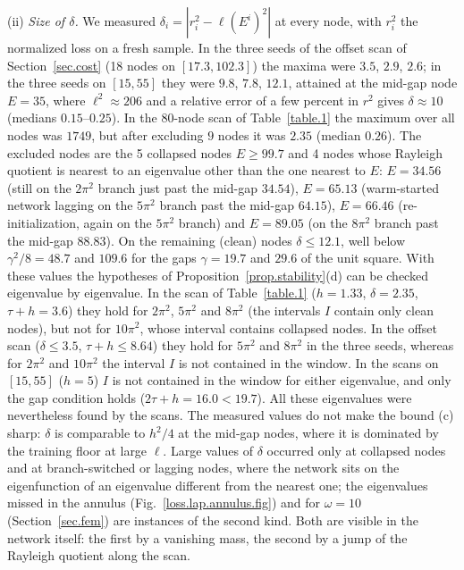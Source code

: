 \documentclass[10pt]{amsart}
\newenvironment{revblock}{\color{blue}}{}
\theoremstyle{definition}
\theoremstyle{remark}
\theoremstyle{plain}
\begin{document}
\begin{revblock}
(ii) \emph{Size of $\delta$.} We measured $\delta_i=|r_i^2-\ell(E^i)^2|$ at every node, with $r_i^2$ the
normalized loss on a fresh sample. In the three seeds of the offset scan of Section~\ref{sec.cost}
(18 nodes on $[17.3,102.3]$) the maxima were $3.5$, $2.9$, $2.6$; in the three seeds on $[15,55]$ they
were $9.8$, $7.8$, $12.1$, attained at the mid-gap node $E=35$, where $\ell^2\approx206$ and a relative
error of a few percent in $r^2$ gives $\delta\approx10$ (medians $0.15$--$0.25$). In the 80-node scan of
Table~\ref{table.1} the maximum over all nodes was $1749$, but after excluding $9$ nodes it was $2.35$
(median $0.26$). The excluded nodes are the 5 collapsed nodes $E\ge99.7$ and 4 nodes whose Rayleigh
quotient is nearest to an eigenvalue other than the one nearest to $E$: $E=34.56$ (still on the
$2\pi^2$ branch just past the mid-gap $34.54$), $E=65.13$ (warm-started network lagging on the
$5\pi^2$ branch past the mid-gap $64.15$), $E=66.46$ (re-initialization, again on the $5\pi^2$ branch)
and $E=89.05$ (on the $8\pi^2$ branch past the mid-gap $88.83$). On the remaining (clean) nodes
$\delta\le12.1$, well below $\gamma^2/8=48.7$ and $109.6$ for the gaps $\gamma=19.7$ and $29.6$ of the
unit square. With these values the hypotheses of Proposition~\ref{prop.stability}(d) can be checked
eigenvalue by eigenvalue. In the scan of Table~\ref{table.1} ($h=1.33$, $\delta=2.35$, $\tau+h=3.6$) they
hold for $2\pi^2$, $5\pi^2$ and $8\pi^2$ (the intervals $I$ contain only clean nodes), but not for
$10\pi^2$, whose interval contains collapsed nodes. In the offset scan ($\delta\le3.5$, $\tau+h\le8.64$)
they hold for $5\pi^2$ and $8\pi^2$ in the three seeds, whereas for $2\pi^2$ and $10\pi^2$ the interval $I$
is not contained in the window. In the scans on $[15,55]$ ($h=5$) $I$ is not contained in the window
for either eigenvalue, and only the gap condition holds ($2\tau+h=16.0<19.7$). All these eigenvalues
were nevertheless found by the scans. The measured values do not make the bound (c) sharp: $\delta$ is
comparable to $h^2/4$ at the mid-gap nodes, where it is dominated by the training floor at large
$\ell$. Large values of $\delta$ occurred only at collapsed nodes and at branch-switched or lagging nodes, where
the network sits on the eigenfunction of an eigenvalue different from the nearest one; the
eigenvalues missed in the annulus (Fig.~\ref{loss.lap.annulus.fig}) and for $\omega=10$
(Section~\ref{sec.fem}) are instances of the second kind. Both are visible in the network itself: the first by a vanishing mass, the second by a
jump of the Rayleigh quotient along the scan.


\end{revblock}
\end{document}
